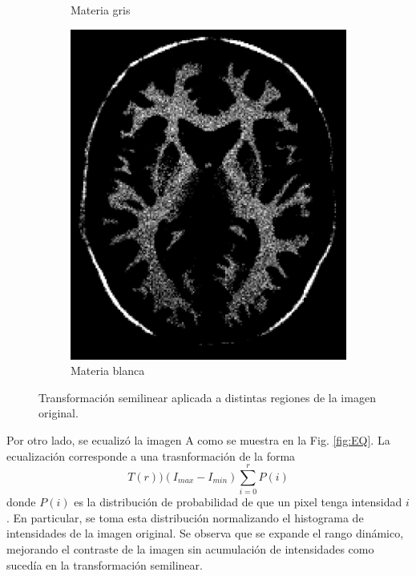 \documentclass[11pt,twocolumn,twoside]{opticajnl}
\begin{document}
\begin{figure}[h]
\begin{subfigure}[h]{0.24\linewidth}
            \caption{Materia gris} 
         \end{subfigure}
         \begin{subfigure}[h]{0.24\linewidth}
            \centering
            \includegraphics[width=\textwidth]{Figuras/ImageA_113_150.png}
            \caption{Materia blanca} 
         \end{subfigure}
    \caption{Transformación semilinear aplicada a distintas regiones de la imagen original.%
    }
    \label{fig:Semilineartrans_region}
\end{figure}

Por otro lado, se ecualizó la imagen A como se muestra en la Fig. \ref{fig:EQ}. La ecualización corresponde a una trasnformación de la forma
\begin{equation}
    T(r) ) (I_{max} - I_{min}) \sum_{i=0}^{r} P(i)
\end{equation}
donde $P(i)$ es la distribución de probabilidad de que un pixel tenga intensidad $i$. En particular, se toma esta distribución normalizando el histograma de intensidades de la imagen original. Se observa que se expande el rango dinámico, mejorando el contraste de la imagen sin acumulación de intensidades como sucedía en la transformación semilinear.
\end{document}
